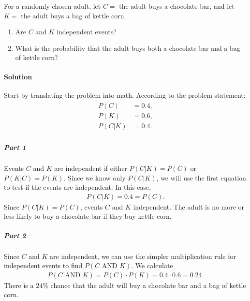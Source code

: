 \documentclass[letterpaper,10pt,english]{jupyterBook}
\begin{document}
\sphinxAtStartPar
For a randomly chosen adult, let \(C = \) the adult buys a chocolate bar, and let \(K = \) the adult buys a bag of kettle corn.
\begin{enumerate}
%
\item {} 
\sphinxAtStartPar
Are \(C\) and \(K\) independent events?

\item {} 
\sphinxAtStartPar
What is the probability that the adult buys both a chocolate bar and a bag of kettle corn?

\end{enumerate}


\paragraph{Solution}
\label{\detokenize{Ch3 Probability/3.3 Multiplication Rules and Independent Events:id1}}
\sphinxAtStartPar
Start by translating the problem into math. According to the problem statement:
\begin{equation*}
\begin{split}
\begin{align}
    P(C) &= 0.4, \\
    P(K) &= 0.6, \\
    P(C|K) &= 0.4.
\end{align}
\end{split}
\end{equation*}

\subparagraph{Part 1}
\label{\detokenize{Ch3 Probability/3.3 Multiplication Rules and Independent Events:part-1}}
\sphinxAtStartPar
Events \(C\) and \(K\) are independent if either \(P(C|K) = P(C)\) or \(P(K|C) = P(K)\). Since we know only \(P(C|K)\), we will use the first equation to test if the events are independent. In this case,
\begin{equation*}
\begin{split} P(C|K) = 0.4 = P(C). \end{split}
\end{equation*}
\sphinxAtStartPar
Since \(P(C|K) = P(C)\), events \(C\) and \(K\)  independent. The adult is no more or less likely to buy a chocolate bar if they buy kettle corn.


\subparagraph{Part 2}
\label{\detokenize{Ch3 Probability/3.3 Multiplication Rules and Independent Events:part-2}}
\sphinxAtStartPar
Since \(C\) and \(K\) are independent, we can use the simpler multiplication rule for independent events to find \(P(C \text{ AND } K)\). We calculate
\begin{equation*}
\begin{split} P(C \text{ AND } K) = P(C) \cdot P(K) = 0.4 \cdot 0.6 = 0.24. \end{split}
\end{equation*}
\sphinxAtStartPar
There is a \(24\%\) chance that the adult will buy a chocolate bar and a bag of kettle corn.
\end{document}
